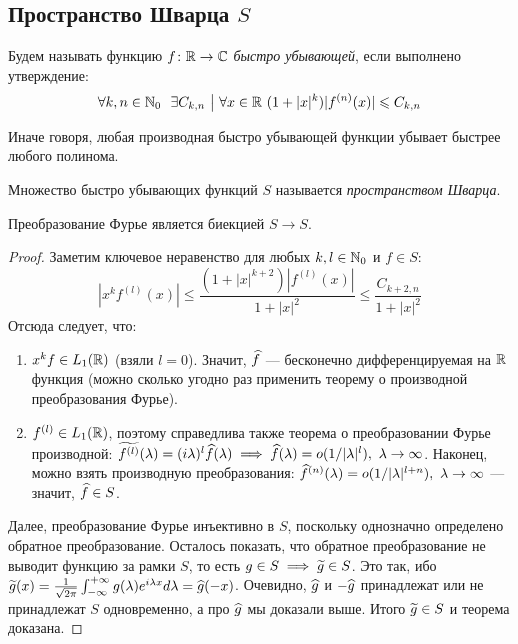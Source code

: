 \subsection{Пространство Шварца $S$}

\begin{definition}
	Будем называть функцию $f \colon \mathbb{R} \to \mathbb{C}$ \textit{быстро убывающей}, если выполнено утверждение:
	\[
		\forall k, n \in \mathbb{N}_0\ \ \exists C_{k, n} \ \big|\  \forall x \in \mathbb{R}\ (1 + |x|^k)|f^{(n)}(x)| \leqslant C_{k, n}
	\]
\end{definition}

\begin{anote}
	Иначе говоря, любая производная быстро убывающей функции убывает быстрее любого полинома.
\end{anote}

\begin{definition}
	Множество быстро убывающих функций $S$ называется \textit{пространством Шварца}.
\end{definition}

\begin{theorem}
	Преобразование Фурье является биекцией $S \to S$.
\end{theorem}

\begin{proof}
	Заметим ключевое неравенство для любых $k, l \in \mathbb{N}_0$ и $f \in S$:
	\[
		|x^kf^{(l)}(x)| \leq \frac{(1 + |x|^{k+2})|f^{(l)}(x)|}{1 + |x|^2} \leq \frac{C_{k+2, n}}{1 + |x|^2}
	\]
	Отсюда следует, что:
	\begin{enumerate}
		\item $x^kf \in L_1(\mathbb{R})$ (взяли $l = 0$). Значит, $\widehat{f}$ --- бесконечно дифференцируемая на $\mathbb{R}$ функция (можно сколько угодно раз применить теорему о производной преобразования Фурье).
		
		\item $f^{(l)} \in L_1(\mathbb{R})$, поэтому справедлива также теорема о преобразовании Фурье производной: $\widetilde{f^{(l)}}(\lambda) = (i\lambda)^{l} \widehat{f}(\lambda) \implies \widehat{f}(\lambda) = o(1/|\lambda|^l), \ \lambda \to \infty$. Наконец, можно взять производную преобразования: $\widehat{f}^{(n)}(\lambda) = o(1/|\lambda|^{l + n}), \ \lambda \to \infty$ --- значит, $\widehat{f} \in S$.
	\end{enumerate}

	Далее, преобразование Фурье инъективно в $S$, поскольку однозначно определено обратное преобразование. Осталось показать, что обратное преобразование не выводит функцию за рамки $S$, то есть $g \in S \implies \widetilde g \in S$. Это так, ибо $\widetilde g(x) = \frac{1}{\sqrt{2\pi}} \int_{-\infty}^{+\infty} g(\lambda) e^{i\lambda x} d\lambda = \widehat{g}(-x)$. Очевидно, $\widehat g$ и $-\widehat g$ принадлежат или не принадлежат $S$ одновременно, а про $\widehat g$ мы доказали выше. Итого $\widetilde g \in S$ и теорема доказана.
\end{proof}

